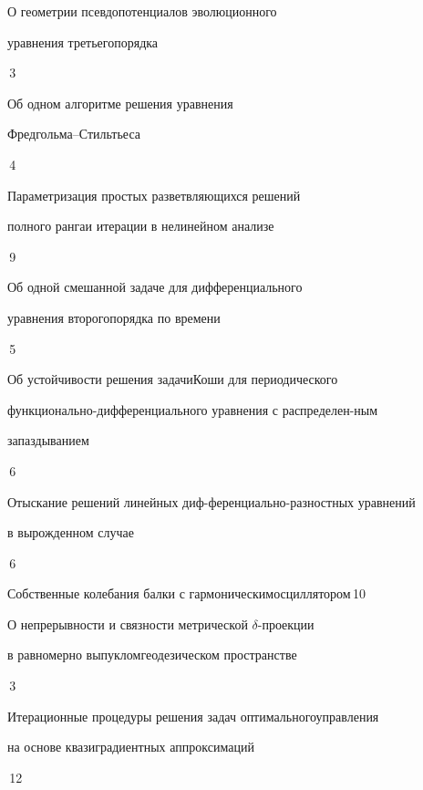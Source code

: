 

{О геометрии псевдопотенциалов эволюционного


уравнения третьего\newline порядка}{\No\,3}




{Об одном алгоритме решения уравнения


Фредгольма--\newline Стильтьеса}{\No\,4}




{Параметризация простых разветвляющихся решений


полного ранга\newline и итерации в нелинейном анализе}{\No\,9}




{Об одной смешанной задаче для дифференциального 


уравнения второго\newline порядка по времени}{\No\,5}




{Об устойчивости решения задачи\newline Коши для периодического


функционально-дифференциального уравнения с распределен-\newline ным


запаздыванием}{\No\,6}




{Отыскание решений линейных диф-\newline ференциально-разностных уравнений 


в вырожденном случае}{\No\,6}




{Собственные колебания балки с гармоническим\newline осциллятором}{\No\,10}




{О непрерывности и связности метрической $\delta$-проекции


в равномерно выпуклом\newline геодезическом пространстве}{\No\,3}




{Итерационные процедуры решения задач оптимального\newline управления


на основе квазиградиентных аппроксимаций}{\No\,12}


